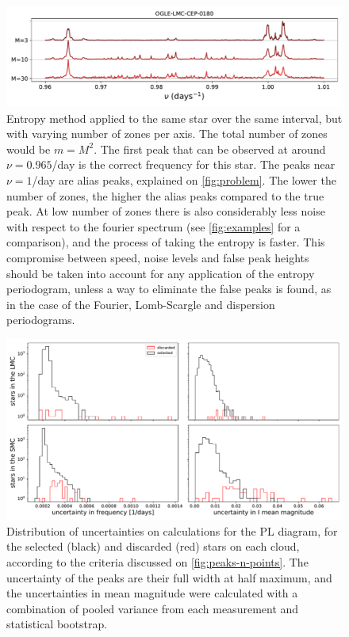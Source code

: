 \begin{figure}
	\centering
	\includegraphics[width=\textwidth]{img/entropy_bins.pdf}
	\caption[Example of zone number dependency for the entropy method]{
		Entropy method applied to the same star over the same interval, but with varying number of zones per axis.
		The total number of zones would be $m=M^2$. 
		The first peak that can be observed at around $\nu=0.965$/day is the correct frequency for this star.
		The peaks near $\nu=1$/day are alias peaks, explained on \autoref{fig:problem}.
		The lower the number of zones, the higher the alias peaks compared to the true peak.
		At low number of zones there is also considerably less noise with respect to the fourier spectrum 
		(see \autoref{fig:examples} for a comparison), and the process of taking the entropy is faster.
		This compromise between speed, noise levels and false peak heights should be taken into account 
		for any application of the entropy periodogram, unless a way to eliminate the false peaks is found,
		as in the case of the Fourier, Lomb-Scargle and dispersion periodograms.
	}
	\label{fig:entropy-alias}
\end{figure}

\begin{figure}
	\centering
	\includegraphics[width=\textwidth]{img/results_uncertainties.pdf}
	\caption[Uncertainties in the PL relation for the processed stars]{
		Distribution of uncertainties on calculations for the PL diagram, for the selected (black) and discarded (red) stars on each cloud, 
		according to the criteria discussed on \autoref{fig:peaks-n-points}.
		The uncertainty of the peaks are their full width at half maximum, 
		and the uncertainties in mean magnitude were calculated with a combination of pooled variance from each measurement and statistical bootstrap.
	}
	\label{fig:uncertainties}
\end{figure}


